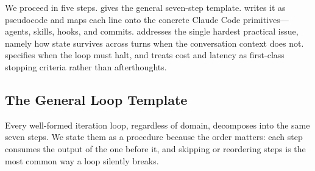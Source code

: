 We proceed in five steps.  gives the general
seven-step template.  writes it as pseudocode and
maps each line onto the concrete Claude Code primitives---agents, skills, hooks,
and commits.  addresses the single hardest
practical issue, namely how state survives across turns when the conversation
context does not.  specifies when the loop must
halt, and  treats cost and latency as
first-class stopping criteria rather than afterthoughts.

\subsection{The General Loop Template}\label{subsec:loop-template}

Every well-formed iteration loop, regardless of domain, decomposes into the same
seven steps. We state them as a procedure because the order matters: each step
consumes the output of the one before it, and skipping or reordering steps is the
most common way a loop silently breaks.

